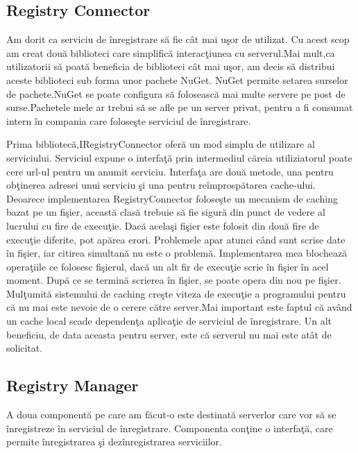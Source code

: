 \documentclass[a4paper,12pt]{report}
\begin{document}
\subsection{Registry Connector}

Am dorit ca serviciu de \^inregistrare s\u a fie c\^at mai u\c sor de utilizat.
Cu acest scop am creat dou\u a biblioteci care simplific\u a interac\c tiunea cu 
serverul.Mai mult,ca utilizatorii s\u a poat\u a beneficia de biblioteci c\^at mai 
u\c sor, am decis s\u a distribui aceste biblioteci sub forma unor pachete NuGet.
NuGet permite setarea surselor de pachete.NuGet se poate configura s\u a foloseasc\u a
mai multe servere pe post de surse.Pachetele mele ar trebui s\u a se afle pe un server 
privat, pentru a fi consumat intern \^in compania care folose\c ste serviciul de \^inregistrare.

Prima bibliotec\u a,IRegistryConnector ofer\u a un mod simplu de utilizare al serviciului.
Serviciul expune o interfa\c t\u a prin intermediul c\u areia utiliziatorul poate
cere url-ul pentru un anumit serviciu. Interfa\c ta are dou\u a metode, una pentru ob\c tinerea
adresei unui serviciu \c si una pentru re\^improsp\u atarea cache-ului.
Deoarece implementarea RegistryConnector folose\c ste un mecanism de caching bazat pe un fi\c sier,
aceast\u a clas\u a trebuie s\u a fie sigur\u a din punct de vedere al lucrului
cu fire de execu\c tie. Dac\u a acela\c si fi\c sier este folosit din dou\u a fire de execu\c tie 
diferite, pot ap\u area erori. Problemele apar atunci c\^and sunt scrise date \^in fi\c sier,
iar citirea simultan\u a nu este o problem\u a. Implementarea mea blocheaz\u a opera\c tiile 
ce folosesc fi\c sierul, dac\u a un alt fir de execu\c tie scrie \^in fi\c sier \^in acel moment.
Dup\u a ce se termin\u a scrierea \^in fi\c sier, se poate opera din nou pe fi\c sier.
Mul\c tumit\u a sistemului de caching cre\c ste viteza de execu\c tie a programului pentru
c\u a nu mai este nevoie de o cerere c\u atre server.Mai important este faptul c\u a
av\^and un cache local scade dependen\c ta aplica\c tie de serviciul de \^inregistrare.
Un alt beneficiu, de data aceasta pentru server, este c\u a serverul nu mai este at\^at de 
solicitat.

\subsection{Registry Manager}

A doua component\u a pe care am f\u acut-o este destinat\u a serverlor care vor s\u a se 
\^inregistreze \^in serviciul de \^inregistrare. Componenta con\c tine o interfa\c t\u a,
care permite \^inregistrarea \c si dez\^inregistrarea serviciilor.
\end{document}
